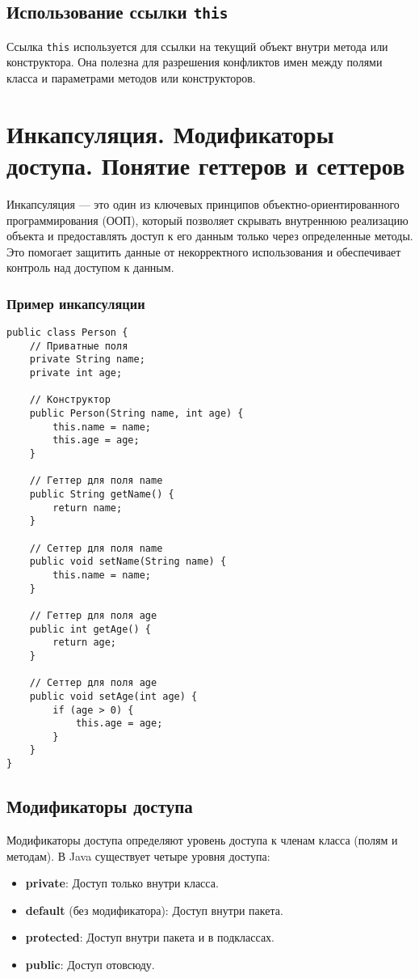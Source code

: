 \documentclass[12pt, a4paper]{article}
\begin{document}
\subsection*{Использование ссылки \texttt{this}}

Ссылка \texttt{this} используется для ссылки на текущий объект внутри метода или конструктора. Она полезна для разрешения конфликтов имен между полями класса и параметрами методов или конструкторов.


\section{Инкапсуляция. Модификаторы доступа. Понятие геттеров и сеттеров}
Инкапсуляция — это один из ключевых принципов объектно-ориентированного программирования (ООП), который позволяет скрывать внутреннюю реализацию объекта и предоставлять доступ к его данным только через определенные методы. Это помогает защитить данные от некорректного использования и обеспечивает контроль над доступом к данным.

\subsubsection*{Пример инкапсуляции}

\begin{verbatim}
public class Person {
    // Приватные поля
    private String name;
    private int age;

    // Конструктор
    public Person(String name, int age) {
        this.name = name;
        this.age = age;
    }

    // Геттер для поля name
    public String getName() {
        return name;
    }

    // Сеттер для поля name
    public void setName(String name) {
        this.name = name;
    }

    // Геттер для поля age
    public int getAge() {
        return age;
    }

    // Сеттер для поля age
    public void setAge(int age) {
        if (age > 0) {
            this.age = age;
        }
    }
}
\end{verbatim}

\subsection*{Модификаторы доступа}
Модификаторы доступа определяют уровень доступа к членам класса (полям и методам). В Java существует четыре уровня доступа:
\begin{itemize}
    \item \textbf{private}: Доступ только внутри класса.
    \item \textbf{default} (без модификатора): Доступ внутри пакета.
    \item \textbf{protected}: Доступ внутри пакета и в подклассах.
    \item \textbf{public}: Доступ отовсюду.
\end{itemize}
\end{document}
